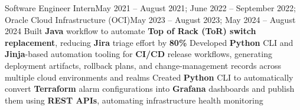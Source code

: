 
\subheading
    {Software Engineer Intern}{May 2021 -- August 2021; June 2022 -- September 2022;}
    {Oracle Cloud Infrastructure (OCI)}{May 2023 -- August 2023; May 2024 -- August 2024}
    \itemListStart
        \listItem{}
            {Built \textbf{Java} workflow to automate \textbf{Top of Rack (ToR) switch replacement}, reducing \textbf{Jira} triage effort by \textbf{80\%}}
        \listItem{}
            {Developed \textbf{Python} CLI and \textbf{Jinja}-based automation tooling for \textbf{CI/CD} release workflows, generating deployment artifacts, rollback plans, and change-management records across multiple cloud environments and realms}
        \listItem{}
            {Created \textbf{Python} CLI to automatically convert \textbf{Terraform} alarm configurations into \textbf{Grafana} dashboards and publish them using \textbf{REST APIs}, automating infrastructure health monitoring}%
        \listItem{}
